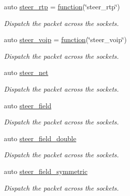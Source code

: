 \begin{DoxyCompactItemize}
auto \hyperlink{namespacepfq_1_1lang_1_1anonymous__namespace_02default_8hpp_03_ac3bc5ec07d93fa5d9266e0e08191fe22}{steer\+\_\+rtp} = \hyperlink{namespacepfq_1_1lang_a1a4638059d700ae08d0ca63886ff2bb3}{function}(\char`\"{}steer\+\_\+rtp\char`\"{})
\begin{DoxyCompactList}\small\item\em Dispatch the packet across the sockets. \end{DoxyCompactList}\item 
auto \hyperlink{namespacepfq_1_1lang_1_1anonymous__namespace_02default_8hpp_03_a50fa612c45aa8f8dfd3259e2d0cbfce0}{steer\+\_\+voip} = \hyperlink{namespacepfq_1_1lang_a1a4638059d700ae08d0ca63886ff2bb3}{function}(\char`\"{}steer\+\_\+voip\char`\"{})
\begin{DoxyCompactList}\small\item\em Dispatch the packet across the sockets. \end{DoxyCompactList}\item 
auto \hyperlink{namespacepfq_1_1lang_1_1anonymous__namespace_02default_8hpp_03_a6f8d514e40bb2b0e874fb26d2b416dc3}{steer\+\_\+net}
\begin{DoxyCompactList}\small\item\em Dispatch the packet across the sockets. \end{DoxyCompactList}\item 
auto \hyperlink{namespacepfq_1_1lang_1_1anonymous__namespace_02default_8hpp_03_ad861e297a10876e534c5c9053ec23999}{steer\+\_\+field}
\begin{DoxyCompactList}\small\item\em Dispatch the packet across the sockets. \end{DoxyCompactList}\item 
auto \hyperlink{namespacepfq_1_1lang_1_1anonymous__namespace_02default_8hpp_03_aabbf7feb753f3c5b1b40cfa8a54581e5}{steer\+\_\+field\+\_\+double}
\begin{DoxyCompactList}\small\item\em Dispatch the packet across the sockets. \end{DoxyCompactList}\item 
auto \hyperlink{namespacepfq_1_1lang_1_1anonymous__namespace_02default_8hpp_03_a422c7bafe8240549d193903890f9ec48}{steer\+\_\+field\+\_\+symmetric}
\begin{DoxyCompactList}\small\item\em Dispatch the packet across the sockets. \end{DoxyCompactList}\item 

\end{DoxyCompactItemize}

